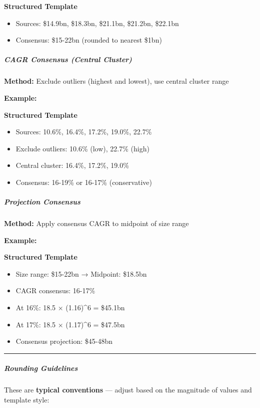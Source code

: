 \documentclass[11pt]{article}
\begin{document}
\textbf{Structured Template}
\begin{itemize}[leftmargin=*,itemsep=2pt,topsep=2pt]
\item {} Sources: \$14.9bn, \$18.3bn, \$21.1bn, \$21.2bn, \$22.1bn
\item {} Consensus: \$15-22bn (rounded to nearest \$1bn)
\end{itemize}

\subparagraph{CAGR Consensus (Central Cluster)}\mbox{}\par

\textbf{Method:} Exclude outliers (highest and lowest), use central cluster range


\textbf{Example:}

\textbf{Structured Template}
\begin{itemize}[leftmargin=*,itemsep=2pt,topsep=2pt]
\item {} Sources: 10.6\%, 16.4\%, 17.2\%, 19.0\%, 22.7\%
\item {} Exclude outliers: 10.6\% (low), 22.7\% (high)
\item {} Central cluster: 16.4\%, 17.2\%, 19.0\%
\item {} Consensus: 16-19\% or 16-17\% (conservative)
\end{itemize}

\subparagraph{Projection Consensus}\mbox{}\par

\textbf{Method:} Apply consensus CAGR to midpoint of size range


\textbf{Example:}

\textbf{Structured Template}
\begin{itemize}[leftmargin=*,itemsep=2pt,topsep=2pt]
\item {} Size range: \$15-22bn → Midpoint: \$18.5bn
\item {} CAGR consensus: 16-17\%
\item {} At 16\%: 18.5 × (1.16)\textasciicircum{}6 = \$45.1bn
\item {} At 17\%: 18.5 × (1.17)\textasciicircum{}6 = \$47.5bn
\item {} Consensus projection: \$45-48bn
\end{itemize}

\vspace{0.5em}\hrule\vspace{0.5em}

\subparagraph{Rounding Guidelines}\mbox{}\par

These are \textbf{typical conventions} — adjust based on the magnitude of values and template style:
\end{document}
